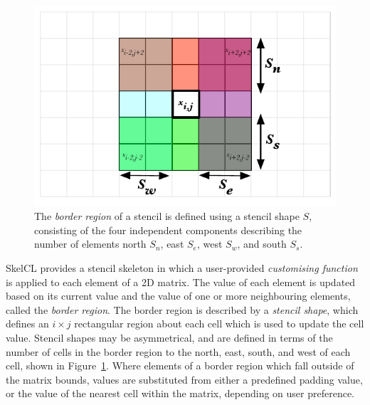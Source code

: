 \documentclass[nonatbib,preprint,10pt]{sigplanconf}
\begin{document}
\begin{figure}
\centering
\includegraphics[width=.6\columnwidth]{img/stencil-shape}
\caption[Stencil border region]{%
  The \emph{border region} of a stencil is defined using a stencil
  shape $S$, consisting of the four independent components describing
  the number of elements north $S_n$, east $S_e$, west $S_w$, and
  south $S_s$.%
}
\label{fig:stencil-shape}
\end{figure}

SkelCL provides a stencil skeleton in which a user-provided
\emph{customising function} is applied to each element of a 2D
matrix. The value of each element is updated based on its current
value and the value of one or more neighbouring elements, called the
\emph{border region}. The border region is described by a
\emph{stencil shape}, which defines an $i \times j$ rectangular region
about each cell which is used to update the cell value. Stencil shapes
may be asymmetrical, and are defined in terms of the number of cells
in the border region to the north, east, south, and west of each cell,
shown in Figure~\ref{fig:stencil-shape}. Where elements of a border
region which fall outside of the matrix bounds, values are substituted
from either a predefined padding value, or the value of the nearest
cell within the matrix, depending on user preference.

%
%
\end{document}
